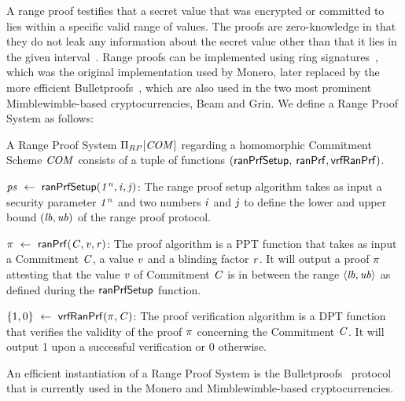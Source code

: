 A range proof testifies that a secret value that was encrypted or committed to lies within a specific valid range of values.
The proofs are zero-knowledge in that they do not leak any information about the secret value other than that it lies in the given interval~\cite{bunz2018bulletproofs}.
Range proofs can be implemented using ring signatures~\cite{noether2016ring}, which was the original implementation used by Monero, later replaced by the more efficient Bulletproofs~\cite{bunz2018bulletproofs}, which are also used in the two most prominent Mimblewimble-based cryptocurrencies, Beam and Grin.
We define a Range Proof System as follows:

\begin{definition}\label{def:pre:rangeproof}
    A Range Proof System $\Pi_{RP}[\mathit{COM}]$ regarding a homomorphic Commitment Scheme $\mathit{COM}$ consists of a tuple of functions $(\mathsf{ranPrfSetup},$ $\mathsf{ranPrf}, \mathsf{vrfRanPrf})$.
    \begin{asparaitem}
        \item $\mathit{ps} ~\leftarrow~ \mathsf{ranPrfSetup}(\mathit{1^n},\mathit{i},\mathit{j})$: The range proof setup algorithm takes as input a security parameter $\mathit{1^n}$ and two numbers $\mathit{i}$ and $\mathit{j}$ to define the lower and upper bound $(\mathit{lb}, \mathit{ub})$ of the range proof protocol.
        \item $\pi ~\leftarrow~ \mathsf{ranPrf}(\mathit{C},\mathit{v},\mathit{r})$: The proof algorithm is a PPT function that takes as input a Commitment $\mathit{C}$, a value $\mathit{v}$ and a blinding factor $\mathit{r}$.
        It will output a proof $\pi$ attesting that the value $\mathit{v}$ of Commitment $\mathit{C}$ is in between the range $\langle \mathit{lb}, \mathit{ub} \rangle$ as defined during the $\mathsf{ranPrfSetup}$ function.
        \item $\{1,0\} ~\leftarrow~ \mathsf{vrfRanPrf}(\pi,\mathit{C})$: The proof verification algorithm is a DPT function that verifies the validity of the proof $\pi$ concerning the Commitment $\mathit{C}$.
        It will output 1 upon a successful verification or 0 otherwise.
    \end{asparaitem}
\end{definition}

An efficient instantiation of a Range Proof System is the Bulletproofs~\cite{bunz2018bulletproofs} protocol that is currently used in the Monero and Mimblewimble-based cryptocurrencies.

